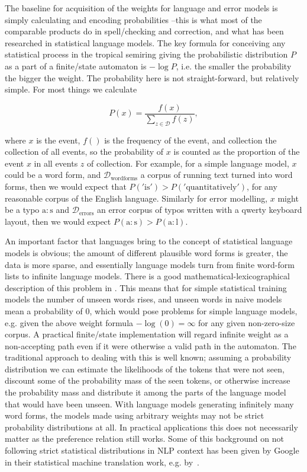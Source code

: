 \documentclass[officiallayout,final]{unihelcompling}
\begin{document}
The baseline for acquisition of the weights for language and error models is
simply calculating and encoding probabilities --this is what most of the
comparable products do in spell\-/checking and correction, and what has been
researched in statistical language models. The key formula for conceiving any
statistical process in the tropical semiring giving the probabilistic
distribution $P$ as a part of a finite\-/state automaton is $-\log P$, i.e. the
smaller the probability the bigger the weight. The probability here is not
straight-forward, but relatively simple. For most things we calculate

\begin{equation} 
    P(x) = \frac{f(x)}{\sum_{z \in \mathcal{D}} f(z)},
\end{equation}

where $x$ is the event, $f()$ is the
frequency of the event, and \gls{collection} the collection of all events, so
the probability of $x$ is counted as the proportion of the event $x$ in all
events $z$ of \gls{collection}. For example, for a simple language model, $x$
could be a word form, and $\mathcal{D}_\mathrm{word forms}$ a corpus of running
text turned into word forms, then we would expect that $P('\mathrm{is}') >
P('\mathrm{quantitatively}')$, for any reasonable corpus of the English
language. Similarly for error modelling, $x$ might be a typo
$\mathrm{a}:\mathrm{s}$ and $\mathcal{D}_\mathrm{errors}$ an error corpus of
typos written with a qwerty keyboard layout, then we would expect
$P(\mathrm{a}:\mathrm{s}) > P(\mathrm{a}:\mathrm{l})$.

An important factor that  languages bring to the concept of
statistical language models is obvious; the amount of different plausible word
forms is greater, the data is more sparse, and essentially language models turn
from finite word-form lists to infinite language models.  There is a good
mathematical-lexicographical description of this problem in
\citet{kornai2002many}. This means that for simple statistical training models
the number of unseen words rises, and unseen words in naive models mean a
probability of $0$, which would pose problems for simple language models, e.g.
given the above weight formula $-\log(0) = \infty$ for any given non-zero-size
corpus. A practical finite\-/state implementation will regard infinite weight
as a non-accepting path even if it were otherwise a valid path in the
automaton.  The traditional approach to dealing with this is well known;
assuming a probability distribution we can estimate the likelihoods of the
tokens that were not seen, discount some of the probability mass of the seen
tokens, or otherwise increase the probability mass and distribute it among the
parts of the language model that would have been unseen. With language models
generating infinitely many word forms, the models made using arbitrary weights
may not be strict probability distributions at all. In practical applications
this does not necessarily matter as the preference relation still works. Some
of this background on not following strict statistical distributions in NLP
context has been given by Google in their statistical machine translation work,
e.g.  by~\citet{brants2007large}.
\end{document}
